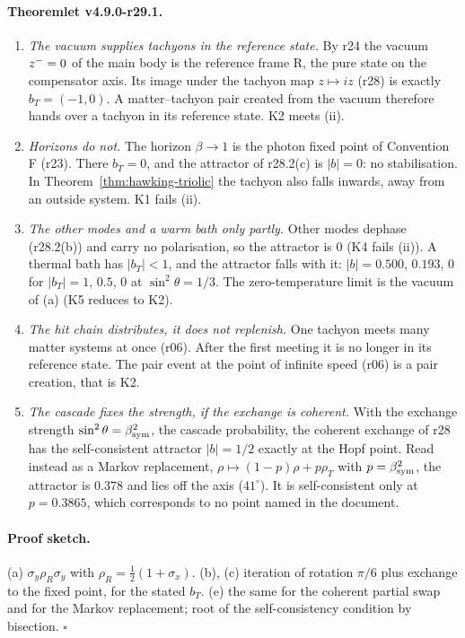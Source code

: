 \paragraph{Theoremlet v4.9.0-r29.1.}
\begin{enumerate}[leftmargin=2em]
\item[(a)] \emph{The vacuum supplies tachyons in the reference state.}  By r24 the vacuum \(z^-=0\) of the main body is the reference
frame R, the pure state on the compensator axis.  Its image under the tachyon map \(z\mapsto iz\) (r28) is exactly \(b_T=(-1,0)\).  A
matter--tachyon pair created from the vacuum therefore hands over a tachyon in its reference state.  K2 meets (ii).
\item[(b)] \emph{Horizons do not.}  The horizon \(\beta\to1\) is the photon fixed point of Convention F (r23).  There \(b_T=0\), and the
attractor of r28.2(c) is \(|b|=0\): no stabilisation.  In Theorem~\ref{thm:hawking-triolic} the tachyon also falls inwards, away
from an outside system.  K1 fails (ii).
\item[(c)] \emph{The other modes and a warm bath only partly.}  Other modes dephase (r28.2(b)) and carry no polarisation, so the attractor
is \(0\) (K4 fails (ii)).  A thermal bath has \(|b_T|<1\), and the attractor falls with it: \(|b|=0.500\), \(0.193\), \(0\) for
\(|b_T|=1\), \(0.5\), \(0\) at \(\sin^2\theta=1/3\).  The zero-temperature limit is the vacuum of (a) (K5 reduces to K2).
\item[(d)] \emph{The hit chain distributes, it does not replenish.}  One tachyon meets many matter systems at once (r06).  After the
first meeting it is no longer in its reference state.  The pair event at the point of infinite speed (r06) is a pair creation,
that is K2.
\item[(e)] \emph{The cascade fixes the strength, if the exchange is coherent.}  With the exchange strength \(\sin^2\theta=\beta_{\mathrm{sym}}^2\), the
cascade probability, the coherent exchange of r28 has the self-consistent attractor \(|b|=1/2\) exactly at the Hopf point.  Read
instead as a Markov replacement, \(\rho\mapsto(1-p)\rho+p\rho_T\) with \(p=\beta_{\mathrm{sym}}^2\), the attractor is \(0.378\) and lies off the axis
(\(41^\circ\)).  It is self-consistent only at \(p=0.3865\), which corresponds to no point named in the document.
\end{enumerate}

\paragraph{Proof sketch.}
(a) \(\sigma_y\rho_R\sigma_y\) with \(\rho_R=\tfrac12(1+\sigma_x)\).  (b), (c) iteration of rotation \(\pi/6\) plus exchange to the fixed point,
for the stated \(b_T\).  (e) the same for the coherent partial swap and for the Markov replacement; root of the self-consistency
condition by bisection.  \(\square\)

